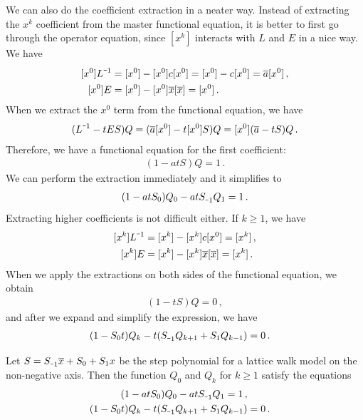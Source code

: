 We can also do the coefficient extraction in a neater way. Instead of extracting the $x^k$ coefficient from the master functional equation, it is better to first go through the operator equation, since $[x^k]$ interacts with $L$ and $E$ in a nice way. We have
\begin{subequations}
	\label{eq:OpExt1}
	\begin{align}
		[x^0]L^{\um 1} &= [x^0]-[x^0]c[x^0] = [x^0]-c[x^0] = \ol a[x^0]\,,\\
		[x^0]E &= [x^0] - [x^0]\ol x[\ol x] = [x^0]\,.
	\end{align}
\end{subequations}
When we extract the $x^0$ term from the functional equation, we have
\begin{align}
	[x^0](L^{\um 1} - t ES)Q = (\ol a[x^0]-t[x^0]S)Q = [x^0](\ol a-t S)Q\,.
\end{align}
Therefore, we have a functional equation for the first coefficient:
\begin{align}
	[x^0](1-at S)Q = 1\,.
\end{align}
We can perform the extraction immediately and it simplifies to
\begin{align}
	(1-at S_0)Q_0-at S_{\um 1}Q_1 = 1\,.
\end{align}
Extracting higher coefficients is not difficult either. If $k \ge 1$, we have
\begin{subequations}
	\label{eq:OpExt2}
	\begin{align}
		[x^k]L^{\um 1} &= [x^k]-[x^k]c[x^0] = [x^k]\,,\\
		[x^k]E &= [x^k] - [x^k]\ol x[\ol x] = [x^k]\,.
	\end{align}
\end{subequations}
When we apply the extractions on both sides of the functional equation, we obtain
\begin{align}
	[x^k](1-t S)Q = 0\,,
\end{align}
and after we expand and simplify the expression, we have
\begin{align}
	 (1-S_0t) Q_k -t(S_{\um 1}Q_{k + 1} + S_1 Q_{k-1}) &= 0\,.
\end{align}

\begin{prop} Let $S = S_{\um 1}\ol x + S_0 + S_1 x$ be the step polynomial for a lattice walk model on the non-negative axis. Then the function $Q_0$ and $Q_k$ for $k\ge 1$ satisfy the equations
\begin{subequations}
	\begin{align}
		(1-at S_0)Q_0-at S_{\um 1}Q_1 = 1\,,\\
		 (1-S_0t) Q_k -t(S_{\um 1}Q_{k + 1} + S_1 Q_{k-1}) &= 0\,.
	\end{align}
\end{subequations}
\end{prop}

